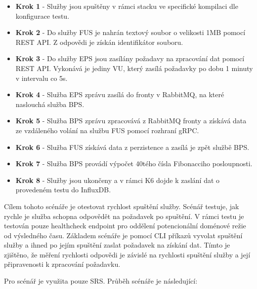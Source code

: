 \begin{itemize}
    \item \textbf{Krok 1} - Služby jsou spuštěny v rámci stacku ve specifické kompilaci dle konfigurace testu.
    \item \textbf{Krok 2} - Do služby FUS je nahrán textový soubor o velikosti 1MB pomocí REST API. Z odpovědi je získán identifikátor souboru.
    \item \textbf{Krok 3} - Do služby EPS jsou zasílány požadavy na zpracování dat pomocí REST API. Vykonává je jediny VU, který zasílá požadavky po dobu 1 minuty v intervalu co 5s.
    \item \textbf{Krok 4} - Služba EPS zprávu zasílá do fronty v RabbitMQ, na které naslouchá služba BPS. 
    \item \textbf{Krok 5} - Služba BPS zprávu zpracovává z RabbitMQ fronty a získává data ze vzdáleného volání na službu FUS pomocí rozhraní gRPC. 
    \item \textbf{Krok 6} - Služba FUS získává data z perzistence a zasílá je zpět službě BPS. 
    \item \textbf{Krok 7} - Služba BPS provádí výpočet 40tého čísla Fibonacciho posloupnosti.
    \item \textbf{Krok 8} - Služby jsou ukončeny a v rámci K6 dojde k zaslání dat o provedeném testu do InfluxDB.
\end{itemize}


Cílem tohoto scénáře je otestovat rychlost spuštění služby. Scénář testuje, jak rychle je služba schopna odpovědět na požadavek po spuštění. V rámci testu je testován pouze healthcheck endpoint pro oddělení potencionální doménové režie od výsledného času. Základem scénáře je pomocí CLI příkazů vyvolat spuštění služby a ihned po jejím spuštění zaslat požadavek na získání dat. Tímto je zjištěno, že měření rychlosti odpovědi je závislé na rychlosti spuštění služby a její připravenosti k zpracování požadavku. 


Pro scénář je využita pouze SRS. Průběh scénáře je následující:

